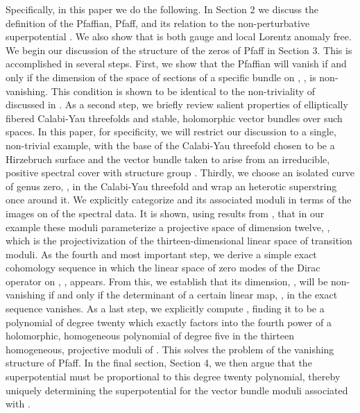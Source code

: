 \documentclass[a4paper,12pt]{article}
\numberwithin{equation}{section}
\theoremstyle{plain}
\begin{document}
Specifically, in this paper we do the following. In Section 2 we discuss
the
definition of the Pfaffian, Pfaff\coordHE{}, and its relation to
the
non-perturbative superpotential \coordHE{}.  We also show that \coordHE{} is both gauge
and
local
Lorentz anomaly free. We begin our discussion of the structure of the
zeros
of Pfaff\coordHE{} in Section 3. This is accomplished in several
steps.
First, we show that the Pfaffian will vanish if and only if the dimension
of
the space of sections of a specific bundle on \coordHE{}, \coordHE{}, is non-vanishing. This condition is
shown to be identical to the non-triviality of \coordHE{} discussed in
\cite{Witten2}. As a second step,
we briefly review salient properties of elliptically
fibered Calabi-Yau threefolds and stable, holomorphic vector bundles over
such
spaces. In this paper, for specificity, we will restrict our discussion to
a
single, non-trivial example, with the base of the Calabi-Yau threefold
chosen
to be a Hirzebruch surface \coordHE{} and the vector bundle \coordHE{}
taken
to arise from an irreducible, positive spectral cover with structure group
\coordHE{}. Thirdly, we choose an isolated curve of genus zero,
\coordHE{}, in the Calabi-Yau threefold and wrap an
\coordHE{} heterotic superstring once around it. We explicitly
categorize \coordHE{} and its associated moduli in terms of the
images on
\coordHE{} of the spectral data. It is shown, using results
from \cite{BDOold},
that in our example these moduli parameterize a projective
space of dimension twelve,
\coordHE{}, which is the projectivization of the
thirteen-dimensional
linear
space of transition moduli. As the fourth and most important step, we
derive a
simple exact cohomology sequence in which the linear space of zero modes
of
the Dirac operator on \coordHE{}, \coordHE{}, appears. From this, we establish that its
dimension,
\coordHE{}, will
be
non-vanishing if and only if the determinant of a certain linear map,
\coordHE{},
in the exact sequence vanishes. As a last step, we explicitly compute
\coordHE{}, finding it to be a polynomial of
degree twenty which exactly factors into the fourth power of a
holomorphic,
homogeneous polynomial of degree five in the thirteen homogeneous,
projective
moduli of \coordHE{}.
This solves the problem
of the vanishing structure of Pfaff\coordHE{}.
In the final section, Section 4, we then argue that the
superpotential \coordHE{} must be proportional to this degree twenty polynomial, 
thereby uniquely determining the
superpotential for the vector bundle moduli associated with
\coordHE{}.
\end{document}
